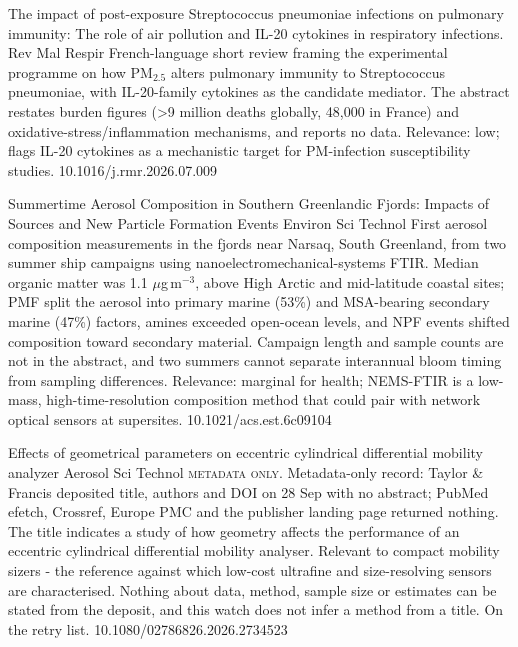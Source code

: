\documentclass[10pt]{article}
\begin{document}
{The impact of post-exposure Streptococcus pneumoniae infections on pulmonary immunity: The role of air pollution and IL-20 cytokines in respiratory infections.}
{Rev Mal Respir}
{French-language short review framing the experimental programme on how PM$_{2.5}$ alters pulmonary immunity to Streptococcus pneumoniae, with IL-20-family cytokines as the candidate mediator. The abstract restates burden figures (>9 million deaths globally, 48,000 in France) and oxidative-stress/inflammation mechanisms, and reports no data. Relevance: low; flags IL-20 cytokines as a mechanistic target for PM-infection susceptibility studies.}
{10.1016/j.rmr.2026.07.009}

\par{}\baselineskip{}\baselineskip
{}

{Summertime Aerosol Composition in Southern Greenlandic Fjords: Impacts of Sources and New Particle Formation Events}
{Environ Sci Technol}
{First aerosol composition measurements in the fjords near Narsaq, South Greenland, from two summer ship campaigns using nanoelectromechanical-systems FTIR. Median organic matter was 1.1 $\mu$g\,m$^{-3}$, above High Arctic and mid-latitude coastal sites; PMF split the aerosol into primary marine (53\%) and MSA-bearing secondary marine (47\%) factors, amines exceeded open-ocean levels, and NPF events shifted composition toward secondary material. Campaign length and sample counts are not in the abstract, and two summers cannot separate interannual bloom timing from sampling differences. Relevance: marginal for health; NEMS-FTIR is a low-mass, high-time-resolution composition method that could pair with network optical sensors at supersites.}
{10.1021/acs.est.6c09104}

\par{}\baselineskip{}\baselineskip
{}

{Effects of geometrical parameters on eccentric cylindrical differential mobility analyzer}
{Aerosol Sci Technol}
{\textsc{metadata only.} Metadata-only record: Taylor \& Francis deposited title, authors and DOI on 28 Sep with no abstract; PubMed efetch, Crossref, Europe PMC and the publisher landing page returned nothing. The title indicates a study of how geometry affects the performance of an eccentric cylindrical differential mobility analyser. Relevant to compact mobility sizers - the reference against which low-cost ultrafine and size-resolving sensors are characterised. Nothing about data, method, sample size or estimates can be stated from the deposit, and this watch does not infer a method from a title. On the retry list.}
{10.1080/02786826.2026.2734523}
\end{document}
